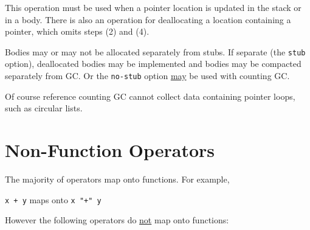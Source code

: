\documentclass[12pt]{article}
\begin{document}
This operation must be used when a pointer location is updated
in the stack or in a body.  There is also an operation for
deallocating a location containing a pointer, which omits steps
(2) and (4).

Bodies may or may not be allocated separately from stubs.
If separate (the {\tt stub} option),
deallocated bodies may be implemented and
bodies may be compacted separately from GC.
Or the {\tt no-stub} option \underline{may} be used with
counting GC.

Of course reference counting GC cannot collect data containing
pointer loops, such as circular lists.

\section{Non-Function Operators}

The majority of operators map onto functions.  For example, \\
\centerline{{\tt x + y} maps onto {\tt x "+" y}}

However the following operators do \underline{not} map onto functions:
\end{document}
